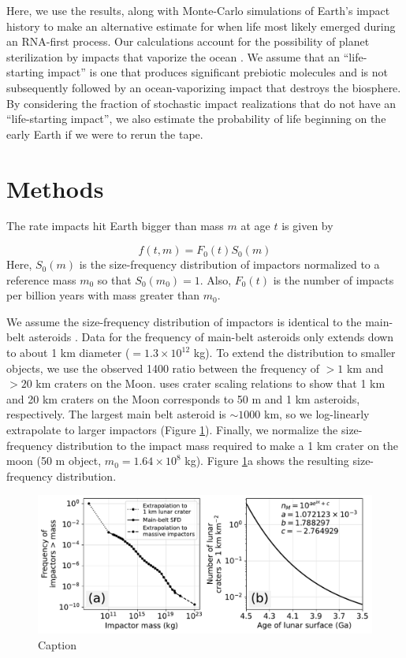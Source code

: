 \documentclass[preprint]{aastex63}
\begin{document}
Here, we use the \citet{Wogan_2023} results, along with Monte-Carlo simulations of Earth's impact history to make an alternative estimate for when life most likely emerged during an RNA-first process. Our calculations account for the possibility of planet sterilization by impacts that vaporize the ocean \citep{Sleep_1989}. We assume that an ``life-starting impact'' is one that produces significant prebiotic molecules and is not subsequently followed by an ocean-vaporizing impact that destroys the biosphere. By considering the fraction of stochastic impact realizations that do not have an ``life-starting impact'', we also estimate the probability of life beginning on the early Earth if we were to rerun the tape.

\section{Methods} \label{sec:methods}
The rate impacts hit Earth bigger than mass $m$ at age $t$ is given by

\begin{equation}
  f(t,m) = F_0(t) S_0(m)
\end{equation}
Here, $S_0(m)$ is the size-frequency distribution of impactors normalized to a reference mass $m_0$ so that $S_0(m_0) = 1$. Also, $F_0(t)$ is the number of impacts per billion years with mass greater than $m_0$.

We assume the size-frequency distribution of impactors is identical to the main-belt asteroids \citep[Extended Data Figure 1,][]{Marchi_2014}. Data for the frequency of main-belt asteroids only extends down to about 1 km diameter ($= 1.3 \times 10^{12} $ kg). To extend the distribution to smaller objects, we use the observed 1400 ratio between the frequency of $> 1$ km and $> 20$ km craters on the Moon. \citet{Morbidelli_2018} uses crater scaling relations to show that 1 km and 20 km craters on the Moon corresponds to 50 m and 1 km asteroids, respectively. The largest main belt asteroid is $\sim 1000$ km, so we log-linearly extrapolate to larger impactors (Figure \ref{fig:sfd_and_flux}). Finally, we normalize the size-frequency distribution to the impact mass required to make a 1 km crater on the moon (50 m object, $m_0 = 1.64 \times 10^{8}$ kg). Figure \ref{fig:sfd_and_flux}a shows the resulting size-frequency distribution.

\begin{figure}
  \centering
  \includegraphics[width=1.0\textwidth]{figures/SFD_and_flux.pdf}
  \caption{Caption}
  \label{fig:sfd_and_flux}
\end{figure}
\end{document}
